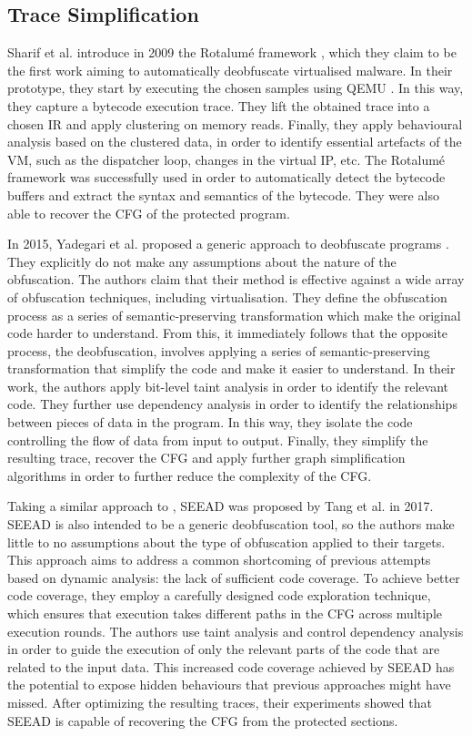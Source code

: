 \subsection{Trace Simplification}

Sharif et al. introduce in 2009 the Rotalumé framework \cite{sharif2009}, which they claim to be the first work aiming to automatically deobfuscate virtualised malware. In their prototype, they start by executing the chosen samples using QEMU \cite{qemu}. In this way, they capture a bytecode execution trace. They lift the obtained trace into a chosen \gls{IR} and apply clustering on memory reads. Finally, they apply behavioural analysis based on the clustered data, in order to identify essential artefacts of the \gls{VM}, such as the dispatcher loop, changes in the virtual \gls{IP}, etc. The Rotalumé framework was successfully used in order to automatically detect the bytecode buffers and extract the syntax and semantics of the bytecode. They were also able to recover the \gls{CFG} of the protected program.

In 2015, Yadegari et al. proposed a generic approach to deobfuscate programs \cite{yadegari2015}. They explicitly do not make any assumptions about the nature of the obfuscation. The authors claim that their method is effective against a wide array of obfuscation techniques, including virtualisation. They define the obfuscation process as a series of semantic-preserving transformation which make the original code harder to understand. From this, it immediately follows that the opposite process, the deobfuscation, involves applying a series of semantic-preserving transformation that simplify the code and make it easier to understand. In their work, the authors apply bit-level taint analysis in order to identify the relevant code. They further use dependency analysis in order to identify the relationships between pieces of data in the program. In this way, they isolate the code controlling the flow of data from input to output. Finally, they simplify the resulting trace, recover the \gls{CFG} and apply further graph simplification algorithms in order to further reduce the complexity of the \gls{CFG}.

Taking a similar approach to \cite{yadegari2015}, SEEAD \cite{tang2017seead} was proposed by Tang et al. in 2017. SEEAD is also intended to be a generic deobfuscation tool, so the authors make little to no assumptions about the type of obfuscation applied to their targets. This approach aims to address a common shortcoming of previous attempts based on dynamic analysis: the lack of sufficient code coverage. To achieve better code coverage, they employ a carefully designed code exploration technique, which ensures that execution takes different paths in the \gls{CFG} across multiple execution rounds. The authors use taint analysis and control dependency analysis in order to guide the execution of only the relevant parts of the code that are related to the input data. This increased code coverage achieved by SEEAD has the potential to expose hidden behaviours that previous approaches might have missed. After optimizing the resulting traces, their experiments showed that SEEAD is capable of recovering the \gls{CFG} from the protected sections.


